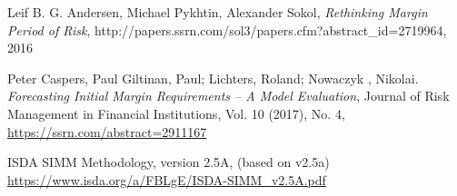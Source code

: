 \documentclass[12pt, a4paper]{article}
\begin{document}
\begin{thebibliography}{*}
 Leif B. G. Andersen, Michael Pykhtin, Alexander Sokol, {\em Rethinking Margin Period of Risk},
  http://papers.ssrn.com/sol3/papers.cfm?abstract\_id=2719964, 2016

 Peter Caspers, Paul Giltinan, Paul; Lichters, Roland; Nowaczyk , Nikolai. {\em Forecasting Initial Margin Requirements – A Model Evaluation}, Journal of Risk Management in Financial Institutions, Vol. 10 (2017), No. 4, \url{https://ssrn.com/abstract=2911167}

 ISDA SIMM Methodology, version 2.5A, (based on v2.5a) \\
  \url{https://www.isda.org/a/FBLgE/ISDA-SIMM\_v2.5A.pdf}

  
\end{thebibliography}

\newpage
{}
\listoftodos[Todo]
\end{document}
